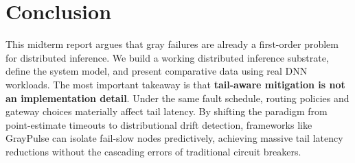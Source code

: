 \documentclass[12pt,conference]{IEEEtran}
\begin{document}
\section{Conclusion}

This midterm report argues that gray failures are already a first-order problem for distributed inference. We build a working distributed inference substrate, define the system model, and present comparative data using real DNN workloads. The most important takeaway is that \textbf{tail-aware mitigation is not an implementation detail}. Under the same fault schedule, routing policies and gateway choices materially affect tail latency. By shifting the paradigm from point-estimate timeouts to distributional drift detection, frameworks like GrayPulse can isolate fail-slow nodes predictively, achieving massive tail latency reductions without the cascading errors of traditional circuit breakers.
\end{document}

